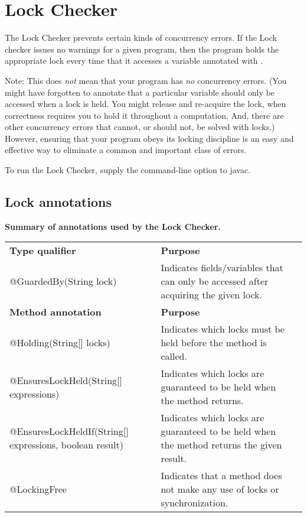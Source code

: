 \htmlhr
\chapter{Lock Checker\label{lock-checker}}

The Lock Checker prevents certain kinds of concurrency errors.  If the Lock
checker issues no warnings for a given program, then the program holds the
appropriate lock every time that it accesses a variable annotated with
.

Note:  This does \emph{not} mean that your program has \emph{no} concurrency
errors.  (You might have forgotten to annotate that a particular variable
should only be accessed when a lock is held.  You might release and
re-acquire the lock, when correctness requires you to hold it throughout a
computation.  And, there are other concurrency errors that cannot, or
should not, be solved with locks.)  However, ensuring that your
program obeys its locking discipline is an easy and effective way to
eliminate a common and important class of errors.


To run the Lock Checker, supply the
command-line option to javac.


\section{Lock annotations\label{lock-annotations}}

\textbf{Summary of annotations used by the Lock Checker.}

\begin{tabular}{l|l|l}
\textbf{Type qualifier} & \textbf{Purpose} \\
@GuardedBy(String lock) &
Indicates fields/variables that can only be accessed after acquiring the given lock.
\\
\textbf{Method annotation} & \textbf{Purpose} \\
@Holding(String[] locks) &
Indicates which locks must be held before the method is called.
\\
@EnsuresLockHeld(String[] expressions) &
Indicates which locks are guaranteed to be held when the method returns.
\\
@EnsuresLockHeldIf(String[] expressions, boolean result) &
Indicates which locks are guaranteed to be held when the method returns the given result.
\\
@LockingFree &
Indicates that a method does not make any use of locks or synchronization.
\\
\end{tabular}

